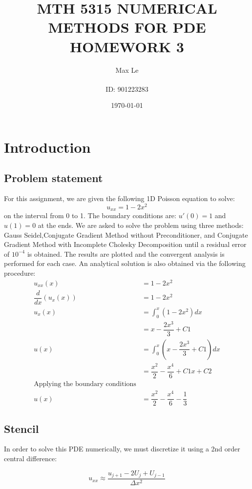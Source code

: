 \documentclass{article}
\title{MTH 5315 NUMERICAL METHODS FOR PDE \\ HOMEWORK 3}
\date{\today}
\author{\Huge Max Le \\ \\ ID: 901223283}
\begin{document}
\maketitle
\newpage
\tableofcontents
\newpage
\listoffigures
\newpage

\section{Introduction}
\subsection{Problem statement}
For this assignment, we are given the following 1D Poisson equation to solve: 
\\

\begin{equation}
u_{xx} = 1-2x^2
\end{equation}
\noindent
on the interval from 0 to 1. The boundary conditions are: $u'(0) = 1$ and $u(1) = 0$ at the ends. We are asked to solve the problem using three methods: Gauss Seidel,Conjugate Gradient Method without Preconditioner, and Conjugate Gradient Method with Incomplete Cholesky Decomposition until a residual error of $10^{-4}$ is obtained. The results are plotted and the convergent analysis is performed for each case. An analytical solution is also obtained via the following procedure: \\

\begin{align*}
u_{xx}(x) &= 1-2x^2 \\
\dfrac{d}{dx}(u_x(x))&= 1-2x^2\\
u_x(x)&= \int_{0}^{x} (1-2x^2) dx\\
&=x-\dfrac{2x^3}{3}+C1\\
u(x) &= \int_{0}^{x} (x-\dfrac{2x^3}{3}+C1) dx\\
&=\dfrac{x^2}{2} - \dfrac{x^4}{6} + C1x + C2\\
\textrm{Applying the boundary conditions}\\
u(x) &=  \dfrac{x^2}{2} - \dfrac{x^4}{6} - \dfrac{1}{3}
\end{align*}
\subsection{Stencil}
In order to solve this PDE numerically, we must discretize it using a 2nd order central difference: 

\begin{equation*}
u_{xx} \approx \dfrac{u_{j+1}-2U_j+U_{j-1}}{\Delta x^2}
\end{equation*}
\end{document}
